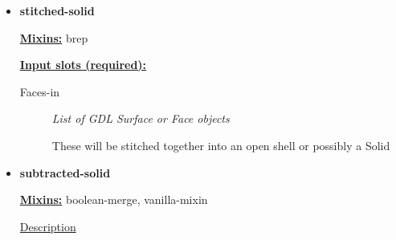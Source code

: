 \documentclass [11pt]{book}
\begin{document}
\begin{itemize}







\item {}
\label{prim:stitched-solid}
\textbf{stitched-solid}


\textbf{
\underline{Mixins:}} brep





\begin{description}

\end{description}








\textbf{
\underline{Input slots (required):}}

\begin{description}

\item [Faces-in]
\emph{List of GDL Surface or Face objects}

 These will be stitched together into an open shell or possibly a Solid




\end{description}







\item {}
\label{prim:subtracted-solid}
\textbf{subtracted-solid}


\textbf{
\underline{Mixins:}} boolean-merge, vanilla-mixin





\begin{description}

\item [
\underline{Description}]



\end{description}
\end{itemize}
\end{document}
